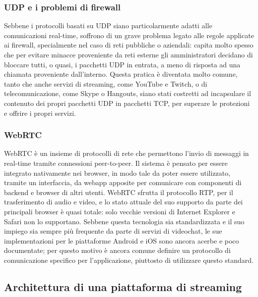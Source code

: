 		\subsubsection{UDP e i problemi di firewall}
			Sebbene i protocolli basati su UDP siano particolarmente adatti alle comunicazioni real-time, soffrono di un grave problema legato alle regole applicate ai firewall, specialmente nel caso di reti pubbliche o aziendali: capita molto spesso che per evitare minacce proveniente da reti esterne gli amministratori decidano di bloccare tutti, o quasi, i pacchetti UDP in entrata, a meno di risposta ad una chiamata proveniente dall'interno. Questa pratica è diventata molto comune, tanto che anche servizi di streaming, come YouTube e Twitch, o di telecomunicazione, come Skype o Hangouts, siano stati costretti ad incapsulare il contenuto dei propri pacchetti UDP in pacchetti TCP, per superare le protezioni e offrire i propri servizi.

		\subsubsection{WebRTC}
			WebRTC è un insieme di protocolli di rete che permettono l'invio di messaggi in real-time tramite connessioni peer-to-peer. Il sistema è pensato per essere integrato nativamente nei browser, in modo tale da poter essere utilizzato, tramite un interfaccia, da webapp apposite per comunicare con componenti di backend e browser di altri utenti. WebRTC sfrutta il protocollo RTP, per il trasferimento di audio e video, e lo stato attuale del suo supporto da parte dei principali browser è quasi totale: solo vecchie versioni di Internet Explorer e Safari non lo supportano. Sebbene questa tecnologia sia standardizzata e il suo impiego sia sempre più frequente da parte di servizi di videochat, le sue implementazioni per le piattaforme Android e iOS sono ancora acerbe e poco documentate; per questo motivo è ancora comune definire un protocollo di comunicazione specifico per l'applicazione, piuttosto di utilizzare questo standard.

	\subsection{Architettura di una piattaforma di streaming}
